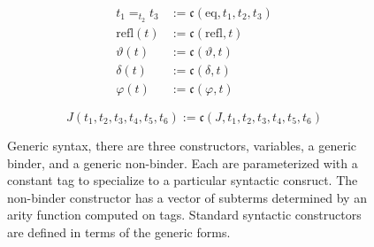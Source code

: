 \begin{figure}
\begin{minipage}{0.5\textwidth}
\begin{align*}
            t_1 =_{t_2} t_3 &:= \mathfrak{c}(\text{eq}, t_1, t_2, t_3) \\
            \text{refl}(t) &:= \mathfrak{c}(\text{refl}, t) \\
            \vartheta(t) &:= \mathfrak{c}(\vartheta, t) \\
            \delta(t) &:= \mathfrak{c}(\delta, t) \\
            \varphi(t) &:= \mathfrak{c}(\varphi, t)
        \end{align*}
    \end{minipage}
    \vspace{-.05in}
    $$J(t_1, t_2, t_3, t_4, t_5, t_6) := \mathfrak{c}(J, t_1, t_2, t_3, t_4, t_5, t_6)$$
    \caption{Generic syntax, there are three constructors, variables, a generic binder, and a generic non-binder. Each are parameterized with a constant tag to specialize to a particular syntactic consruct. The non-binder constructor has a vector of subterms determined by an arity function computed on tags. Standard syntactic constructors are defined in terms of the generic forms.}
    \label{fig:syntax}
\end{figure}
